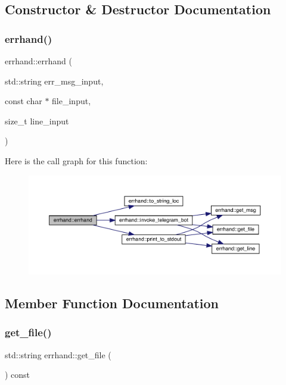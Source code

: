 \subsection{Constructor \& Destructor Documentation}
\mbox{\label{classerrhand_a69afd61e0ebf5ee9d35f297dc2d5c086}} 
\subsubsection{\texorpdfstring{errhand()}{errhand()}}
{\footnotesize\ttfamily errhand\+::errhand (\begin{DoxyParamCaption}\item[{std\+::string}]{err\+\_\+msg\+\_\+input,  }\item[{const char $\ast$}]{file\+\_\+input,  }\item[{size\+\_\+t}]{line\+\_\+input }\end{DoxyParamCaption})\hspace{0.3cm}{\ttfamily [inline]}}

Here is the call graph for this function\+:\nopagebreak
\begin{figure}[H]
\begin{center}
\leavevmode
\includegraphics[width=350pt]{classerrhand_a69afd61e0ebf5ee9d35f297dc2d5c086_cgraph}
\end{center}
\end{figure}


\subsection{Member Function Documentation}
\mbox{\label{classerrhand_a1556ee8d0aaefeea3bbab73f7ae50914}} 
\subsubsection{\texorpdfstring{get\+\_\+file()}{get\_file()}}
{\footnotesize\ttfamily std\+::string errhand\+::get\+\_\+file (\begin{DoxyParamCaption}{ }\end{DoxyParamCaption}) const\hspace{0.3cm}{\ttfamily [inline]}}

